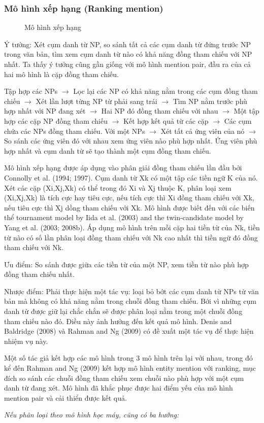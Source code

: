 \documentclass[12pt]{extarticle}
\begin{document}
			\subsubsection*{Mô hình xếp hạng (Ranking mention)}
				\begin{figure}[H]
					\centering
					
					\caption{Mô hình xếp hạng}
				\end{figure}
				\par Ý tưởng: Xét cụm danh từ NP, so sánh tất cả các cụm danh từ đứng trước NP trong văn bản, tìm xem cụm danh từ nào có khả năng đồng tham chiếu với NP nhất. Ta thấy ý tưởng cũng gần giống với mô hình mention pair, đầu ra của cả hai mô hình là cặp đồng tham chiếu.
				\par Tập hợp các NPs $\rightarrow$ Lọc lại các NP có khả năng nằm trong các cụm đồng tham chiếu $\rightarrow$ Xét lần lượt từng NP từ phải sang trái $\rightarrow$ Tìm NP nằm trước phù hợp nhất với NP đang xét $\rightarrow$ Hai NP đó đồng tham chiếu với nhau $\rightarrow$ Một tập hợp các cặp NP đồng tham chiếu $\rightarrow$ Kết hợp kết quả từ các cặp $\rightarrow$ Các cụm chứa các NPs đồng tham chiếu.
				Với một NPs $\rightarrow$ Xét tất cả ứng viên của nó $\rightarrow$ So sánh các ứng viên đó với nhau xem ứng viên nào phù hợp nhất. Ứng viên phù hợp nhất và cụm danh từ sẽ tạo thành một cụm đồng tham chiếu.
				\par Mô hình xếp hạng được áp dụng vào phân giải đồng tham chiếu lần đầu bởi Connolly et al. (1994; 1997). Cụm danh từ Xk có một tập các tiền ngữ K của nó. Xét các cặp (Xi,Xj,Xk) có thể trong đó Xi và Xj thuộc K, phân loại xem (Xi,Xj,Xk) là tích cực hay tiêu cực, nếu tích cực thì Xi đồng tham chiếu với Xk, nếu tiêu cực thì Xj dồng tham chiếu với Xk. Mô hình được biết đến với các biến thể tournament
				model by Iida et al. (2003) and the twin-candidate model by Yang et al. (2003; 2008b). Áp dụng mô hình trên mỗi cặp hai tiền từ của Nk, tiền từ nào có số lần phân loại đồng tham chiếu với Nk cao nhất thì tiền ngữ đó đồng tham chiếu với Nk.
				\par Ưu điểm: So sánh được giữa các tiền từ của một NP, xem tiền từ nào phù hợp đồng tham chiếu nhất.
				\par Nhược điểm: Phải thực hiện một tác vụ: loại bỏ bớt các cụm danh từ NPs từ văn bản mà không có khả năng nằm trong chuỗi đồng tham chiếu. Bới vì những cụm danh từ được giữ lại chắc chắn sẽ được phân loại nằm trong một chuỗi đồng tham chiếu nào đó. Điều này ảnh hưởng đến kết quả mô hình. Denis and Baldridge (2008) và Rahman and Ng (2009) có đề xuất một tác vụ để thực hiện nhiệm vụ này.					
				\par Một số tác giả kết hợp các mô hình trong 3 mô hình trên lại với nhau, trong đó kể đến Rahman and Ng (2009) kết hợp mô hình entity mention với ranking, mục đích so sánh các chuỗi đồng tham chiếu xem chuỗi nào phù hợp với một cụm danh từ đang xét. Mô hình đã khắc phục được hai điểm yếu của mô hình mention pair và cải thiển được kết quả.
			\par \textit{Nếu phân loại theo mô hình học máy, cũng có ba hướng:}
\end{document}
